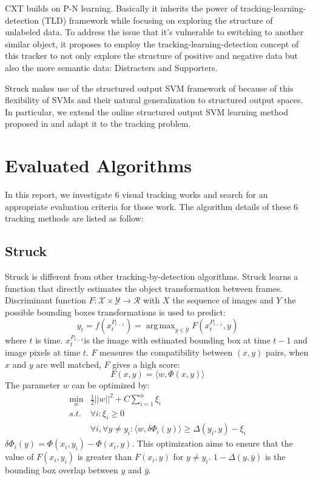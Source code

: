 \documentclass{acm_proc_article-sp}
\DeclareMathOperator*{\argmax}{arg\,max}
\DeclareMathOperator*{\minbelow}{min}
\begin{document}
CXT builds on P-N learning\cite{rw7}. 
Basically it inherits the power of tracking-learning-detection (TLD)\cite{rw8} framework while focusing on exploring the structure of unlabeled data.
To address the issue that it's vulnerable to switching to another similar object, it proposes to employ the tracking-learning-detection concept of this tracker to not only explore the structure of positive and negative data but also the more semantic data: Distracters and Supporters.

Struck makes use of the structured output SVM framework of\cite{rw9} because of this flexibility of SVMs and their natural generalization to structured output spaces.
In particular, we extend the online structured output SVM learning method proposed in\cite{cw10}\cite{cw11} and adapt it to the tracking problem.

\section{Evaluated Algorithms}
In this report, we investigate 6 visual tracking works and search for an appropriate evaluation criteria for those work. The algorithm details of these 6 tracking methods are listed as follow:

\subsection{Struck}
Struck\cite{struck} is different from other tracking-by-detection algorithms. Struck learns a function that directly estimates the object transformation between frames. Discriminant function $F:\mathcal{X} \times \mathcal{Y} \to \mathcal{R}$ with $X$ the sequence of images and $Y$ the possible bounding boxes transformations is used to predict:
\[
y_t = f(x_t^{P_{t-1}}) = \argmax_{y\in \mathcal{Y}}F(x_t^{P_{t-1}},y)
\]
where $t$ is time. $x_t^{P_{t-1}}$is the image with estimated bounding box at time $t-1$ and image pixels at time $t$. $F$ measures the compatibility between $(x,y)$ pairs, when $x$ and $y$ are well matched, $F$ gives a high score:
\[
F(x,y)=\langle w, \Phi(x,y) \rangle
\]
The parameter $w$ can be optimized by:
\begin{align}
\minbelow_w	&\frac{1}{2}||w||^2 + C \sum_{i=1}^n\xi_i\nonumber\\
	s.t.	&\forall i: \xi_i \ge 0\nonumber\\
			&\forall i, \forall y\not= y_i : \langle w, \delta\Phi_i(y)\rangle \ge \Delta(y_i,y)-\xi_i
\end{align}
$\delta\Phi_i(y)=\Phi(x_i, y_i) - \Phi(x_i, y)$. This optimization aims to ensure that the value of $F(x_i, y_i)$ is greater than $F(x_i, y)$ for $y\not= y_i$. $1-\Delta(y,\bar{y})$ is the bounding box overlap between $y$ and $\bar{y}$.
\end{document}
